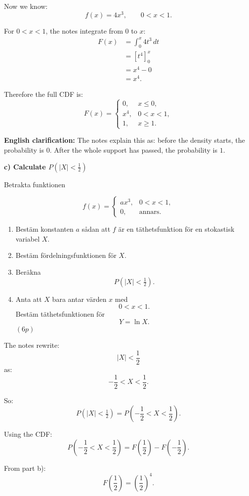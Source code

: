 \documentclass[10pt]{article}
\begin{document}
Now we know:
\[
f(x)=4x^3,
\qquad 0<x<1.
\]

For \(0<x<1\), the notes integrate from \(0\) to
\(x\):
\begin{align*}
F(x)
&=
\int_0^x 4t^3\,dt
\\[2mm]
&=
\left[
t^4
\right]_0^x
\\[2mm]
&=
x^4-0
\\[2mm]
&=
x^4.
\end{align*}

Therefore the full CDF is:
\[
F(x)=
\begin{cases}
0,
& x\le 0,\\
x^4,
& 0<x<1,\\
1,
& x\ge 1.
\end{cases}
\]

\textbf{English clarification:}
The notes explain this as: before the density starts,
the probability is \(0\). After the whole support has
passed, the probability is \(1\).

\textbf{c) Calculate \(P(|X|<\frac12)\)}

Betrakta funktionen

\[
f(x)=
\begin{cases}
ax^3,
& 0<x<1,\\
0,
& \text{annars}.
\end{cases}
\]

\begin{enumerate}[label=\alph*)]
\item Bestäm konstanten \(a\) sådan att \(f\) är en
täthetsfunktion för en stokastisk variabel \(X\).

\item Bestäm fördelningsfunktionen för \(X\).

\item Beräkna
\[
P(|X|<\tfrac12).
\]

\item Anta att \(X\) bara antar värden \(x\) med
\[
0<x<1.
\]
Bestäm täthetsfunktionen för
\[
Y=\ln X.
\]
\((6p)\)
\end{enumerate}

The notes rewrite:
\[
|X|<\frac12
\]
as:
\[
-\frac12<X<\frac12.
\]

So:
\[
P(|X|<\tfrac12)
=
P\left(
-\frac12<X<\frac12
\right).
\]

Using the CDF:
\[
P\left(
-\frac12<X<\frac12
\right)
=
F\left(\frac12\right)
-
F\left(-\frac12\right).
\]

From part b):
\[
F\left(\frac12\right)
=
\left(\frac12\right)^4.
\]
\end{document}
